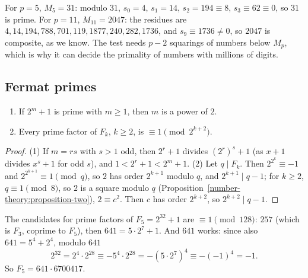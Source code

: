 \begin{example}\label{prime-numbers:example-lucas-lehmer}
For $p = 5$, $M_5 = 31$: modulo $31$, $s_0 = 4$, $s_1 = 14$, $s_2 = 194 \equiv 8$, $s_3 \equiv 62 \equiv 0$, so $31$ is prime. For $p = 11$, $M_{11} = 2047$: the residues are $4, 14, 194, 788, 701,
119, 1877, 240, 282, 1736$, and $s_9 \equiv 1736 \neq 0$, so $2047$ is composite, as we know. The test needs $p - 2$ squarings of numbers below $M_p$, which is why it can decide the primality of
numbers with millions of digits.
\end{example}

\subsection{Fermat primes}\label{prime-numbers:subsection-fermat}

\begin{proposition}\label{prime-numbers:proposition-fermat-basic}
\begin{enumerate}
\item If $2^m + 1$ is prime with $m \geq 1$, then $m$ is a power of $2$.
\item Every prime factor of $F_k$, $k \geq 2$, is $\equiv 1 \pmod{2^{k+2}}$.
\end{enumerate}
\end{proposition}

\begin{proof}
(1) If $m = rs$ with $s > 1$ odd, then $2^r + 1$ divides $(2^r)^s + 1$ (as $x + 1$ divides $x^s + 1$ for odd $s$), and $1 < 2^r + 1 < 2^m + 1$.
(2) Let $q \mid F_k$. Then $2^{2^k} \equiv -1$ and $2^{2^{k+1}} \equiv 1 \pmod q$, so $2$ has order $2^{k+1}$ modulo $q$, and $2^{k+1} \mid q - 1$; for $k \geq 2$, $q \equiv 1 \pmod 8$, so $2$ is a square
modulo $q$ (Proposition~\ref{number-theory:proposition-two}), $2 \equiv c^2$. Then $c$ has order $2^{k+2}$, so $2^{k+2} \mid q - 1$.
\end{proof}

\begin{example}[Euler]\label{prime-numbers:example-euler-641}
The candidates for prime factors of $F_5 = 2^{32} + 1$ are $\equiv 1 \pmod{128}$: $257$ (which is $F_3$, coprime to $F_5$), then $641 = 5 \cdot 2^7 + 1$. And $641$ works: since also
$641 = 5^4 + 2^4$, modulo $641$
\[
2^{32} = 2^4 \cdot 2^{28} \equiv -5^4 \cdot 2^{28} = -(5 \cdot 2^7)^4 \equiv -(-1)^4 = -1.
\]
So $F_5 = 641 \cdot 6700417$.
\end{example}

